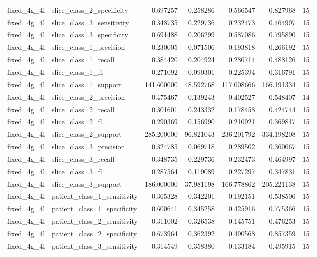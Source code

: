 \begin{tabular}{llrrrrr}
fixed_4g_4l & slice_class_2_specificity & 0.697257 & 0.258286 & 0.566547 & 0.827968 & 15 \\
fixed_4g_4l & slice_class_3_sensitivity & 0.348735 & 0.229736 & 0.232473 & 0.464997 & 15 \\
fixed_4g_4l & slice_class_3_specificity & 0.691488 & 0.206299 & 0.587086 & 0.795890 & 15 \\
fixed_4g_4l & slice_class_1_precision & 0.230005 & 0.071506 & 0.193818 & 0.266192 & 15 \\
fixed_4g_4l & slice_class_1_recall & 0.384420 & 0.204924 & 0.280714 & 0.488126 & 15 \\
fixed_4g_4l & slice_class_1_f1 & 0.271092 & 0.090301 & 0.225394 & 0.316791 & 15 \\
fixed_4g_4l & slice_class_1_support & 141.600000 & 48.592768 & 117.008666 & 166.191334 & 15 \\
fixed_4g_4l & slice_class_2_precision & 0.475467 & 0.139243 & 0.402527 & 0.548407 & 14 \\
fixed_4g_4l & slice_class_2_recall & 0.301601 & 0.243332 & 0.178458 & 0.424744 & 15 \\
fixed_4g_4l & slice_class_2_f1 & 0.290369 & 0.156990 & 0.210921 & 0.369817 & 15 \\
fixed_4g_4l & slice_class_2_support & 285.200000 & 96.821043 & 236.201792 & 334.198208 & 15 \\
fixed_4g_4l & slice_class_3_precision & 0.324785 & 0.069718 & 0.289502 & 0.360067 & 15 \\
fixed_4g_4l & slice_class_3_recall & 0.348735 & 0.229736 & 0.232473 & 0.464997 & 15 \\
fixed_4g_4l & slice_class_3_f1 & 0.287564 & 0.119089 & 0.227297 & 0.347831 & 15 \\
fixed_4g_4l & slice_class_3_support & 186.000000 & 37.981198 & 166.778862 & 205.221138 & 15 \\
fixed_4g_4l & patient_class_1_sensitivity & 0.365328 & 0.342201 & 0.192151 & 0.538506 & 15 \\
fixed_4g_4l & patient_class_1_specificity & 0.600641 & 0.345258 & 0.425916 & 0.775366 & 15 \\
fixed_4g_4l & patient_class_2_sensitivity & 0.311002 & 0.326538 & 0.145751 & 0.476253 & 15 \\
fixed_4g_4l & patient_class_2_specificity & 0.673964 & 0.362392 & 0.490568 & 0.857359 & 15 \\
fixed_4g_4l & patient_class_3_sensitivity & 0.314549 & 0.358380 & 0.133184 & 0.495915 & 15 \\

\end{tabular}
